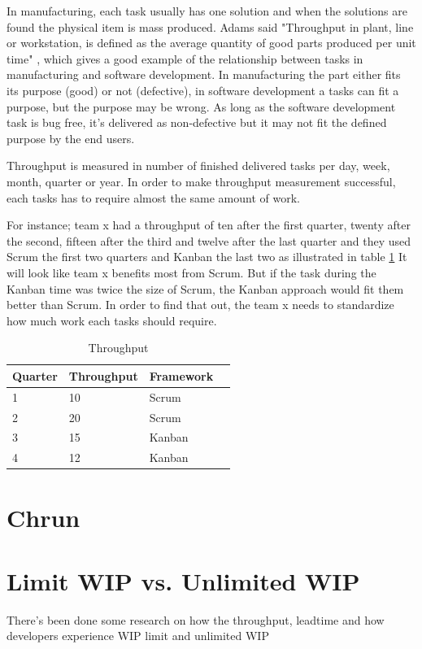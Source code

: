 \documentclass[UKenglish]{ifimaster}  %
\begin{document}
In manufacturing, each task usually has one solution and when the solutions are found the physical item is mass produced.  Adams said "Throughput in plant, line or workstation, is defined as the average quantity of good  parts produced per unit time" \parencite{Adams}, which gives a good example of the relationship between tasks in manufacturing and software development. In manufacturing the part either fits its purpose (good) or not (defective), in software development a tasks can fit a purpose, but the purpose may be wrong. As long as the software development task is bug free, it's delivered as non-defective but it may not fit the defined purpose by the end users. 

Throughput is measured in number of finished delivered tasks per day, week, month, quarter or year. In order to make throughput measurement successful, each tasks has to require almost the same amount of work.  

For instance; team x had a throughput of ten after the first quarter, twenty after the second, fifteen after the third and twelve after the last quarter and they used Scrum the first two quarters and Kanban the last two as illustrated in table \ref{tt}
It will look like team x benefits most from Scrum. But if the task during the Kanban time was twice the size of Scrum, the Kanban approach would fit them better than Scrum. In order to find that out, the team x needs to standardize how much work each tasks should require.

\begin{table}[ht]
\begin{center}
    \begin{tabular}{| l | l | l | l |}
    \hline
    Quarter & Throughput &  Framework\\ \hline
    1 & 10 & Scrum\\ \hline
    2 & 20 & Scrum \\ \hline
    3 & 15 & Kanban\\ \hline
    4 & 12 & Kanban\\ \hline
    \end{tabular}
\caption{Throughput}
\label{tt} %
\end{center}
\end{table}

\section{Chrun}

\section {Limit WIP vs. Unlimited WIP}
There's been done some research on how the throughput, leadtime and how developers experience WIP limit and unlimited WIP
\end{document}

